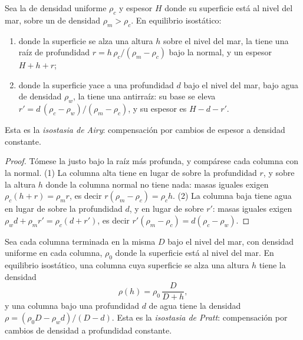 \begin{proposition}\label{prop:b1:isostasy-gravity:airy}
Sea la  de densidad uniforme $\rho_c$ y espesor $H$ donde su superficie está al nivel del mar, sobre un  de densidad
$\rho_m > \rho_c$. En equilibrio isostático:
\begin{enumerate}
  \item donde la superficie se alza una altura $h$ sobre el nivel del mar, la  tiene
        una raíz de profundidad $r = h\,\rho_c/(\rho_m - \rho_c)$ bajo la  normal,
        y un espesor $H + h + r$;
  \item donde la superficie yace a una profundidad $d$ bajo el nivel del mar, bajo agua de
        densidad $\rho_w$, la  tiene una antirraíz: su base se eleva
        $r' = d\,(\rho_c - \rho_w)/(\rho_m - \rho_c)$, y su espesor es
        $H - d - r'$.
\end{enumerate}
Esta es la \emph{isostasia de Airy}: compensación por cambios de espesor a densidad constante.
\end{proposition}

\begin{proof}
Tómese la  justo bajo la raíz más profunda, y compárese cada columna con la normal. (1) La columna alta
tiene  en lugar de  sobre la profundidad $r$, y  sobre la altura $h$ donde la columna normal no tiene nada:
masas iguales exigen $\rho_c(h + r) = \rho_m r$, es decir $r(\rho_m - \rho_c) = \rho_c h$. (2) La columna baja tiene agua en lugar de
 sobre la profundidad $d$, y  en lugar de  sobre $r'$: masas iguales exigen $\rho_w d + \rho_m r' = \rho_c(d + r')$,
es decir $r'(\rho_m - \rho_c) =
d(\rho_c - \rho_w)$.
\end{proof}

\begin{proposition}\label{prop:b1:isostasy-gravity:pratt}
Sea cada columna terminada en la misma  $D$ bajo el nivel del mar, con densidad uniforme en cada columna,
$\rho_0$ donde la superficie está al nivel del mar. En equilibrio isostático, una columna cuya superficie se alza una altura $h$ tiene
la densidad
\[
  \rho(h) = \rho_0\,\frac{D}{D + h},
\]
y una columna bajo una profundidad $d$ de agua tiene la densidad $\rho = (\rho_0 D - \rho_w d)/(D - d)$. Esta es la \emph{isostasia de
Pratt}: compensación por cambios de densidad a profundidad constante.
\end{proposition}

